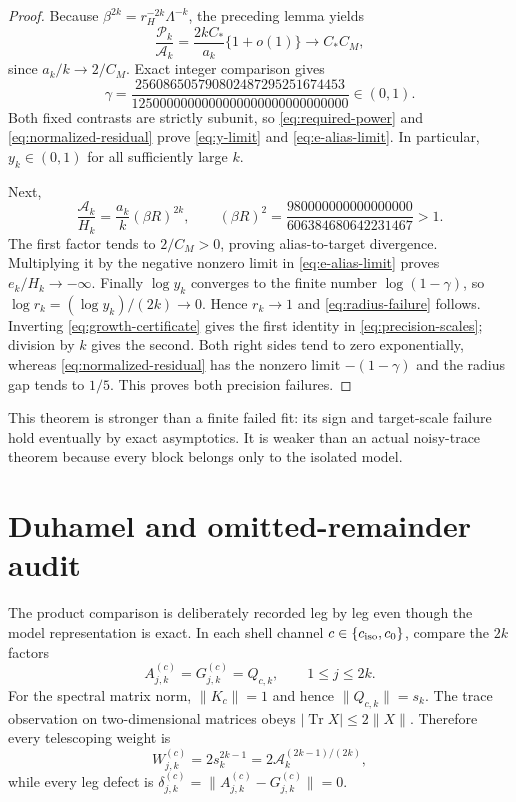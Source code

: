 \documentclass[11pt]{article}
\theoremstyle{remark}
\newcommand{\Tr}{\operatorname{Tr}}
\newcommand{\cA}{\mathcal A}
\newcommand{\cP}{\mathcal P}
\begin{document}
\begin{proof}
Because $\beta^{2k}=r_H^{-2k}\Lambda^{-k}$, the preceding lemma yields
\[
 \frac{\cP_k}{\cA_k}
 =\frac{2kC_*}{a_k}\{1+o(1)\}
 \longrightarrow C_*C_M,
 \]
since $a_k/k\to2/C_M$.  Exact integer comparison gives
\begin{equation}
 \gamma
 =\frac{256086505790802487295251674453}
        {1250000000000000000000000000000}\in(0,1).
 \label{eq:exact-gamma}
\end{equation}
Both fixed contrasts are strictly subunit, so
\eqref{eq:required-power} and \eqref{eq:normalized-residual} prove
\eqref{eq:y-limit} and \eqref{eq:e-alias-limit}.  In particular,
$y_k\in(0,1)$ for all sufficiently large $k$.

Next,
\begin{equation}
 \frac{\cA_k}{H_k}
 =\frac{a_k}{k}(\beta R)^{2k},
 \qquad
 (\beta R)^2
 =\frac{980000000000000000}{606384680642231467}>1.
 \label{eq:growth-certificate}
\end{equation}
The first factor tends to $2/C_M>0$, proving alias-to-target divergence.
Multiplying it by the negative nonzero limit in
\eqref{eq:e-alias-limit} proves $e_k/H_k\to-\infty$.
Finally $\log y_k$ converges to the finite number $\log(1-\gamma)$, so
$\log r_k=(\log y_k)/(2k)\to0$.  Hence $r_k\to1$ and
\eqref{eq:radius-failure} follows.  Inverting
\eqref{eq:growth-certificate} gives the first identity in
\eqref{eq:precision-scales}; division by $k$ gives the second.  Both right
sides tend to zero exponentially, whereas
\eqref{eq:normalized-residual} has the nonzero limit
$-(1-\gamma)$ and the radius gap tends to $1/5$.  This proves both precision
failures.
\end{proof}

This theorem is stronger than a finite failed fit: its sign and target-scale
failure hold eventually by exact asymptotics.  It is weaker than an actual
noisy-trace theorem because every block belongs only to the isolated model.

\section{Duhamel and omitted-remainder audit}

The product comparison is deliberately recorded leg by leg even though the
model representation is exact.  In each shell channel
$c\in\{c_{\rm iso},c_0\}$, compare the $2k$ factors
\begin{equation}
 A_{j,k}^{(c)}=G_{j,k}^{(c)}=Q_{c,k},
 \qquad 1\le j\le2k.
 \label{eq:identical-legs}
\end{equation}
For the spectral matrix norm, $\lVert K_c\rVert=1$ and hence
$\lVert Q_{c,k}\rVert=s_k$.  The trace observation on two-dimensional
matrices obeys $|\Tr X|\le2\lVert X\rVert$.  Therefore every telescoping
weight is
\begin{equation}
 W_{j,k}^{(c)}=2s_k^{2k-1}
 =2\cA_k^{(2k-1)/(2k)},
 \label{eq:duhamel-weight}
\end{equation}
while every leg defect is
$\delta_{j,k}^{(c)}=\lVert A_{j,k}^{(c)}-G_{j,k}^{(c)}\rVert=0$.
\end{document}
